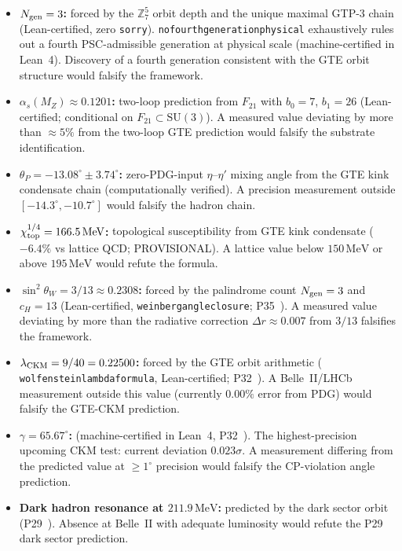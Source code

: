 \documentclass[11pt]{article}
\theoremstyle{remark}
\newcommand{\lean}[1]{%
  \penalty-100
  \begingroup\def\_{\textunderscore\allowbreak}\texttt{#1}\endgroup}
\begin{document}
\begin{itemize}
  \item \textbf{$N_{\rm gen} = 3$:} forced by the $\mathbb{Z}_7^5$ orbit depth and the
    unique maximal GTP-3 chain (Lean-certified, zero \texttt{sorry}).
    \lean{no\_fourth\_generation\_physical} exhaustively rules out a fourth PSC-admissible
    generation at physical scale (machine-certified in Lean~4).
    Discovery of a fourth generation consistent with the GTE orbit structure would falsify the framework.

  \item \textbf{$\alpha_s(M_Z) \approx 0.1201$:} two-loop prediction from $F_{21}$ with
    $b_0 = 7$, $b_1 = 26$ (Lean-certified; conditional on $F_{21} \subset \mathrm{SU}(3)$).
    A measured value deviating by more than $\approx 5\%$ from the two-loop GTE prediction
    would falsify the substrate identification.

  \item \textbf{$\theta_P = -13.08^\circ \pm 3.74^\circ$:} zero-PDG-input $\eta$--$\eta'$
    mixing angle from the GTE kink condensate chain (computationally verified).
    A precision measurement outside $[-14.3^\circ, -10.7^\circ]$ would falsify the hadron chain.

  \item \textbf{$\chi_{\rm top}^{1/4} = 166.5\,\mathrm{MeV}$:} topological susceptibility
    from GTE kink condensate ($-6.4\%$ vs lattice QCD; PROVISIONAL).
    A lattice value below $150\,\mathrm{MeV}$ or above $195\,\mathrm{MeV}$ would refute the formula.

  \item \textbf{$\sin^2\!\theta_W = 3/13 \approx 0.2308$:} forced by the palindrome
    count $N_{\rm gen}=3$ and $c_H = 13$ (Lean-certified,
    \lean{weinberg\_angle\_closure}; P35~\cite{SpivackGTEUnification}).
    A measured value deviating by more than the radiative correction
    $\Delta r \approx 0.007$ from $3/13$ falsifies the framework.

  \item \textbf{$\lambda_{\rm CKM} = 9/40 = 0.22500$:} forced by the GTE orbit
    arithmetic (\lean{wolfenstein\_lambda\_formula}, Lean-certified; P32~\cite{SpivackCKM}).
    A Belle~II/LHCb measurement outside this value (currently $0.00\%$ error from PDG)
    would falsify the GTE-CKM prediction.

  \item \textbf{$\gamma = 65.67^\circ$:} (machine-certified in Lean~4, P32~\cite{SpivackCKM}).
    The highest-precision upcoming CKM test: current deviation $0.023\sigma$.
    A measurement differing from the predicted value at $\geq 1^\circ$ precision
    would falsify the CP-violation angle prediction.

  \item \textbf{Dark hadron resonance at $211.9\,\text{MeV}$:} predicted by the dark
    sector orbit (P29~\cite{SpivackUGP2024}). Absence at Belle~II with adequate
    luminosity would refute the P29 dark sector prediction.
\end{itemize}
\end{document}
